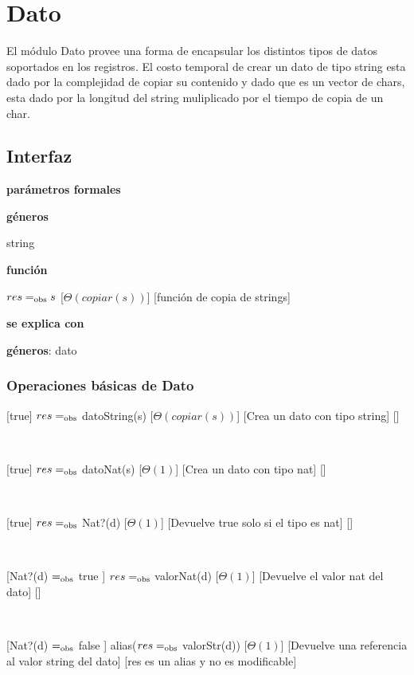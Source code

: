 
\section{Dato}

El módulo Dato provee una forma de encapsular los distintos tipos de datos soportados en los registros. 
El costo temporal de crear un dato de tipo string esta dado por la complejidad de copiar su contenido y dado que es un vector de chars, esta dado por la longitud del string muliplicado por el tiempo de copia de un char.

\subsection{Interfaz}
 
  \textbf{parámetros formales}\parindent\\
  \parbox{1.7cm}{\textbf{géneros}} string\\
  \parbox[t]{1.7cm}{\textbf{función}}\parbox[t]{\textwidth-2\parindent-1.7cm}{%
    {$res =_{\mathrm{obs}} s$}
    [$\Theta(copiar(s))$]
    [función de copia de strings]
  }



\textbf{se explica con}  

\textbf{géneros}: dato


\subsubsection{Operaciones básicas de Dato}


[true]
{$res =_{\mathrm{obs}}$ datoString(s)}
[$\Theta(copiar(s))$]
[Crea un dato con tipo string]
[]

~

[true]
{$res =_{\mathrm{obs}}$ datoNat(s)}
[$\Theta(1)$]
[Crea un dato con tipo nat]
[]

~

[true]
{$res =_{\mathrm{obs}}$ Nat?(d)}
[$\Theta(1)$]
[Devuelve true solo si el tipo es nat]
[]

~

[Nat?(d) $=_{\mathrm{obs}}$ true ]
{$res =_{\mathrm{obs}}$ valorNat(d)}
[$\Theta(1)$]
[Devuelve el valor nat del dato]
[]

~

[Nat?(d) $=_{\mathrm{obs}}$ false ]
{alias($res =_{\mathrm{obs}}$ valorStr(d))}
[$\Theta(1)$]
[Devuelve una referencia al valor string del dato]
[res es un alias y no es modificable]

